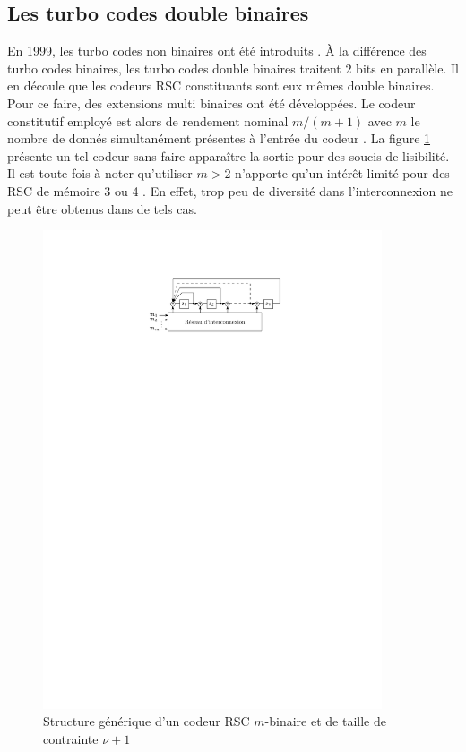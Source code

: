 \subsection{Les turbo codes double binaires}\label{sec:dbl}
En 1999, les turbo codes non binaires ont été introduits \cite{doublebin1}. À la différence des turbo codes binaires, les turbo codes double binaires traitent $2$ bits en parallèle. Il en découle que les codeurs RSC constituants sont eux mêmes double binaires. Pour ce faire, des extensions multi binaires ont été développées. Le codeur constitutif employé est alors de rendement nominal $m/(m+1)$ avec $m$ le nombre de donnés simultanément présentes à l'entrée du codeur \cite{doublebin3}. La figure \ref{fig:encMulti} présente un tel codeur sans faire apparaître la sortie pour des soucis de lisibilité. Il est toute fois à noter qu'utiliser $m > 2$ n'apporte qu'un intérêt limité pour des RSC de mémoire 3 ou 4 \cite{Balta2013}. En effet, trop peu de diversité dans l'interconnexion ne peut être obtenus dans de tels cas.
\begin{figure}[!h]
	\centering
	\includegraphics[width=10cm]{main/ch1_fig/encMulti.pdf}
	\caption{\label{fig:encMulti} Structure générique d'un codeur RSC $m$-binaire et de taille de contrainte $\nu +1$}
\end{figure}

